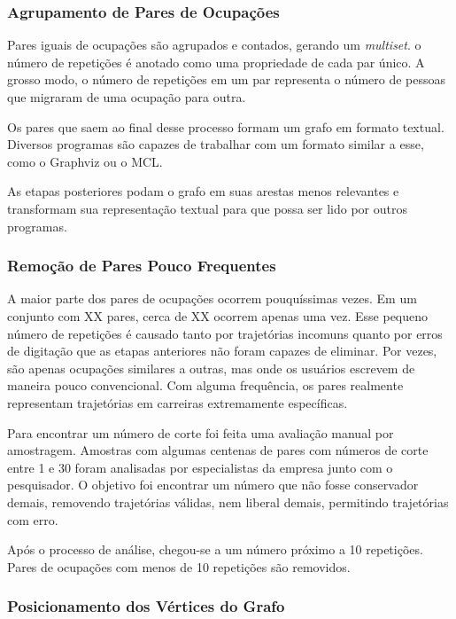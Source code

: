 \documentclass[12pt,a4paper]{article}
\begin{document}
\subsubsection{Agrupamento de Pares de Ocupações}

Pares iguais de ocupações são agrupados e contados, gerando um \textit{multiset}. o número de repetições é anotado como uma propriedade de cada par único. A grosso modo, o número de repetições em um par representa o número de pessoas que migraram de uma ocupação para outra.

Os pares que saem ao final desse processo formam um grafo em formato textual. Diversos programas são capazes de trabalhar com um formato similar a esse, como o Graphviz ou o MCL.

As etapas posteriores podam o grafo em suas arestas menos relevantes e transformam sua representação textual para que possa ser lido por outros programas.

\subsubsection{Remoção de Pares Pouco Frequentes} \label{sec:grafo-final}

A maior parte dos pares de ocupações ocorrem pouquíssimas vezes. Em um conjunto com XX pares, cerca de XX ocorrem apenas uma vez. Esse pequeno número de repetições é causado tanto por trajetórias incomuns quanto por erros de digitação que as etapas anteriores não foram capazes de eliminar. Por vezes, são apenas ocupações similares a outras, mas onde os usuários escrevem de maneira pouco convencional. Com alguma frequência, os pares realmente representam trajetórias em carreiras extremamente específicas.

Para encontrar um número de corte foi feita uma avaliação manual por amostragem. Amostras com algumas centenas de pares com números de corte entre 1 e 30 foram analisadas por especialistas da empresa junto com o pesquisador. O objetivo foi encontrar um número que não fosse conservador demais, removendo trajetórias válidas, nem liberal demais, permitindo trajetórias com erro.

Após o processo de análise, chegou-se a um número próximo a 10 repetições. Pares de ocupações com menos de 10 repetições são removidos.

\subsubsection{Posicionamento dos Vértices do Grafo}
\end{document}
